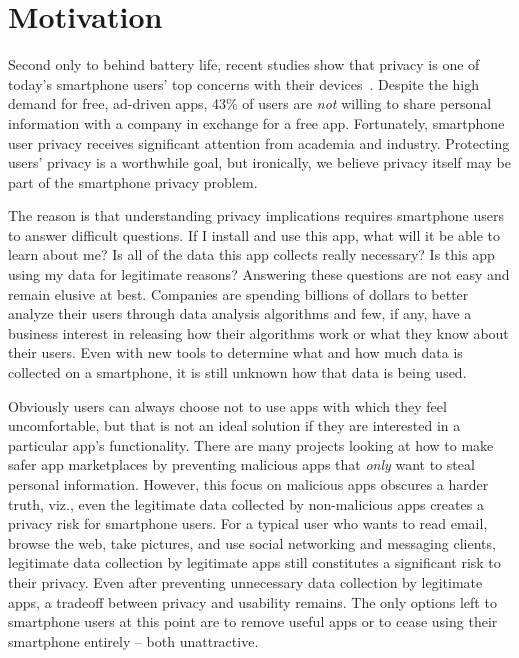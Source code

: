 
\section{Motivation}
\label{sec-motivation}

Second only to behind battery life, recent studies show that privacy is one of
today's smartphone users' top concerns with their
devices~\cite{truste-privacy}. Despite the high demand for free, ad-driven
apps, 43\% of users are \textit{not} willing to share personal information with
a company in exchange for a free app.  Fortunately, smartphone user privacy
receives significant attention from academia and industry. Protecting users'
privacy is a worthwhile goal, but ironically, we believe privacy itself may be
part of the smartphone privacy problem.

The reason is that understanding privacy implications requires smartphone users
to answer difficult questions. If I install and use this app, what will it be
able to learn about me? Is all of the data this app collects really necessary?
Is this app using my data for legitimate reasons? Answering these questions are
not easy and remain elusive at best. Companies are spending billions of dollars
to better analyze their users through data analysis algorithms and few, if any,
have a business interest in releasing how their algorithms work or what they
know about their users. Even with new tools to determine what and how much data
is collected on a smartphone, it is still unknown how that data is being used.

Obviously users can always choose not to use apps with which they feel
uncomfortable, but that is not an ideal solution if they are interested in a
particular app's functionality.  There are many projects looking at how to make
safer app marketplaces by preventing malicious apps that \textit{only} want to
steal personal information.  However, this focus on malicious apps obscures a
harder truth, viz., even the legitimate data collected by non-malicious apps
creates a privacy risk for smartphone users. For a typical user who wants to
read email, browse the web, take pictures, and use social networking and
messaging clients, legitimate data collection by legitimate apps still
constitutes a significant risk to their privacy. Even after preventing
unnecessary data collection by legitimate apps, a tradeoff between privacy and
usability remains. The only options left to smartphone users at this point are
to remove useful apps or to cease using their smartphone entirely -- both
unattractive.

